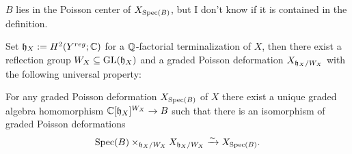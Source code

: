 \begin{rk}
  $B$ lies in the Poisson center of $X_{\operatorname{Spec}(B)}$, but I don't know if it is contained in the definition.
\end{rk}


\begin{thm}
  Set $\mathfrak{h}_X := H^2(Y^{reg};\mathbb{C})$ for a $\mathbb{Q}$-factorial terminalization of $X$, then there exist a reflection group $W_X  \subseteq \operatorname{GL}(\mathfrak{h}_X)$ and a graded Poisson deformation $X_{\mathfrak{h}_X / W_X}$ with the following universal property:

  For any graded Poisson deformation $X_{\operatorname{Spec}(B)}$ of $X$ there exist a unique graded algebra homomorphism $\mathbb{C}[\mathfrak{h}_X]^{W_X} \to B$ such that there is an isomorphism of graded Poisson deformations
  \[
    \operatorname{Spec}(B) \times_{\mathfrak{h}_X / W_X} X_{\mathfrak{h}_X / W_X} \xrightarrow{\sim} X_{\operatorname{Spec}(B)}.
  \]
\end{thm}

\begin{center}
\end{center}

